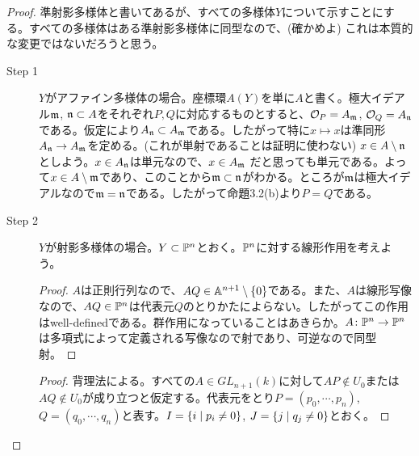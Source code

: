 
\begin{proof} 準射影多様体と書いてあるが、すべての多様体$Y$について示すことにする。すべての多様体はある準射影多様体に同型なので、(確かめよ) これは本質的な変更ではないだろうと思う。
  \begin{description}
    \item[Step 1] $Y$がアファイン多様体の場合。座標環$A(Y)$を単に$A$と書く。極大イデアル$\frakm$, $\frakn \subset A$をそれぞれ$P,Q$に対応するものとすると、$\calo_P = A_{\frakm}$, $\calo_Q = A_{\frakn}$である。仮定により$A_{\frakn} \subset A_{\frakm}$である。したがって特に$x \mapsto x$は準同形$A_{\frakn} \to A_{\frakm}$を定める。(これが単射であることは証明に使わない)
    $x \in A \setminus \frakn$としよう。$x \in A_{\frakn}$は単元なので、$x \in A_{\frakm}$
    だと思っても単元である。よって$x \in A \setminus \frakm$であり、このことから$\frakm \subset \frakn$がわかる。ところが$\frakm$は極大イデアルなので$\frakm = \frakn$である。したがって命題3.2(b)より$P = Q$である。
    \item[Step 2] $Y$が射影多様体の場合。$Y \subset \P^n$とおく。$\P^n$に対する線形作用を考えよう。
    \begin{proof}
$A$は正則行列なので、$AQ \in  \A^{n+1} \setminus \{0\}$である。また、$A$は線形写像なので、$AQ \in \P^n$は代表元$Q$のとりかたによらない。したがってこの作用はwell-definedである。群作用になっていることはあきらか。$A \colon \P^n \to \P^n$は多項式によって定義される写像なので射であり、可逆なので同型射。
    \end{proof}
    \begin{proof}
背理法による。すべての$A \in GL_{n+1}(k)$に対して$  AP \notin U_0$または$  AQ \notin U_0$が成り立つと仮定する。代表元をとり$P = (p_0, \cdots , p_n)$, $Q = (q_0, \cdots , q_n)$と表す。$I = \setmid{i}{p_i \neq 0}$, $J = \setmid{j}{q_j \neq 0}$とおく。


\end{proof}
\end{description}
\end{proof}
